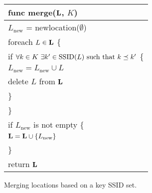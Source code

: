 \begin{algorithm}[t]
    \centering
    \begin{tabular}{|l|} \hline
        func merge($\mathbf{L}$, $K$) \\ \hline
        $L_\mathrm{new}$ = newlocation($\emptyset$)\\
        foreach $L\in\mathbf{L}$ \{ \\
            \RRR if $\forall k\in K\ \exists k'\in\mathrm{SSID}(L)\ \mathrm{such\ that}\ k\preceq k'$ \{ \\
            \RRR \RRR $L_\mathrm{new} = L_\mathrm{new}\cup L$ \\
            \RRR \RRR delete $L$ from $\mathbf{L}$ \\
            \RRR \} \\
        \} \\
        if $L_\mathrm{new}$ is not empty \{ \\
        \RRR $\mathbf{L} = \mathbf{L}\cup\{L_\mathrm{new}\}$ \\
        \} \\
        return $\mathbf{L}$ \\ \hline
    \end{tabular}
    \vspace{0.4cm}
    \caption{Merging locations based on a key SSID set.}
    \label{alg:merge}
\end{algorithm}













